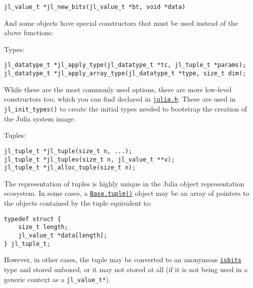 \begin{lstlisting}
jl_value_t *jl_new_bits(jl_value_t *bt, void *data)
\end{lstlisting}



And some objects have special constructors that must be used instead of the above functions:



Types:




\begin{lstlisting}
jl_datatype_t *jl_apply_type(jl_datatype_t *tc, jl_tuple_t *params);
jl_datatype_t *jl_apply_array_type(jl_datatype_t *type, size_t dim);
\end{lstlisting}



While these are the most commonly used options, there are more low-level constructors too, which you can find declared in \href{https://github.com/JuliaLang/julia/blob/master/src/julia.h}{\texttt{julia.h}}. These are used in \texttt{jl\_init\_types()} to create the initial types needed to bootstrap the creation of the Julia system image.



Tuples:




\begin{lstlisting}
jl_tuple_t *jl_tuple(size_t n, ...);
jl_tuple_t *jl_tuplev(size_t n, jl_value_t **v);
jl_tuple_t *jl_alloc_tuple(size_t n);
\end{lstlisting}



The representation of tuples is highly unique in the Julia object representation ecosystem. In some cases, a \hyperlink{12342862450082530092}{\texttt{Base.tuple()}} object may be an array of pointers to the objects contained by the tuple equivalent to:




\begin{lstlisting}
typedef struct {
    size_t length;
    jl_value_t *data[length];
} jl_tuple_t;
\end{lstlisting}



However, in other cases, the tuple may be converted to an anonymous \hyperlink{12980593021531333073}{\texttt{isbits}} type and stored unboxed, or it may not stored at all (if it is not being used in a generic context as a \texttt{jl\_value\_t*}).



